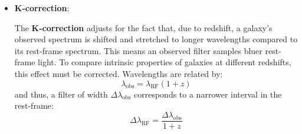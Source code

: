 \begin{itemize}
    \item \textbf{K-correction}:

    The \textbf{K-correction} adjusts for the fact that, due to redshift, a galaxy's observed spectrum is shifted and stretched to longer wavelengths compared to its rest-frame spectrum. This means an observed filter samples bluer rest-frame light. To compare intrinsic properties of galaxies at different redshifts, this effect must be corrected.
    Wavelengths are related by:
    $$
    \lambda_{\text{obs}} = \lambda_{\text{RF}} (1 + z)
    $$
    and thus, a filter of width $\Delta \lambda_{\text{obs}}$ corresponds to a narrower interval in the rest-frame:
    $$
    \Delta \lambda_{\text{RF}} = \frac{\Delta \lambda_{\text{obs}}}{1 + z}
    $$

    \vspace{-1.5em}

    \begin{figure}[H]
        \centering
        \begin{minipage}{0.42\textwidth}
            \hspace{0.6em}
\end{minipage}
\end{figure}
\end{itemize}
